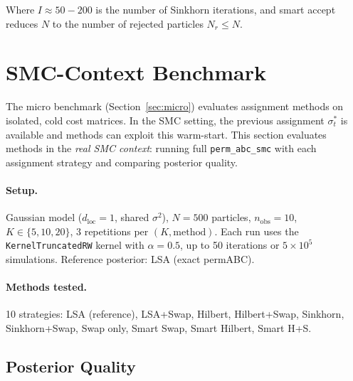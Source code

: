 \documentclass[11pt,a4paper]{article}
\begin{document}
Where $I \approx 50{-}200$ is the number of Sinkhorn iterations, and smart accept reduces $N$ to the number of rejected particles $N_r \le N$.


\section{SMC-Context Benchmark}
\label{sec:smc_context}

The micro benchmark (Section~\ref{sec:micro}) evaluates assignment methods on isolated, cold cost matrices. In the SMC setting, the previous assignment $\sigma_t^*$ is available and methods can exploit this warm-start. This section evaluates methods in the \emph{real SMC context}: running full \texttt{perm\_abc\_smc} with each assignment strategy and comparing posterior quality.

\paragraph{Setup.} Gaussian model ($d_{\text{loc}}=1$, shared $\sigma^2$), $N=500$ particles, $n_{\text{obs}}=10$, $K \in \{5, 10, 20\}$, 3 repetitions per $(K, \text{method})$. Each run uses the \texttt{KernelTruncatedRW} kernel with $\alpha=0.5$, up to 50 iterations or $5 \times 10^5$ simulations. Reference posterior: LSA (exact permABC).

\paragraph{Methods tested.} 10 strategies: LSA (reference), LSA+Swap, Hilbert, Hilbert+Swap, Sinkhorn, Sinkhorn+Swap, Swap only, Smart Swap, Smart Hilbert, Smart H+S.

\subsection{Posterior Quality}
\end{document}
